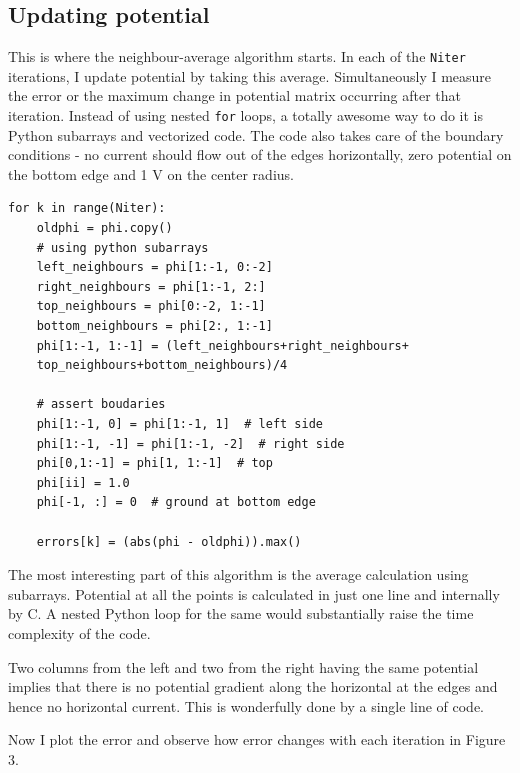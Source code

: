 \documentclass[11pt, a4paper]{article}
\begin{document}
\subsection{Updating potential}
This is where the neighbour-average algorithm starts. In each of the \texttt{Niter} iterations, I update potential by taking this average. Simultaneously I measure the error or the maximum change in potential matrix occurring after that iteration. Instead of using nested \texttt{for} loops, a totally awesome way to do it is Python subarrays and vectorized code. The code also takes care of the boundary conditions - no current should flow out of the edges horizontally, zero potential on the bottom edge and 1 V on the center radius.

\begin{verbatim}
for k in range(Niter):
    oldphi = phi.copy()
    # using python subarrays
    left_neighbours = phi[1:-1, 0:-2]
    right_neighbours = phi[1:-1, 2:]
    top_neighbours = phi[0:-2, 1:-1]
    bottom_neighbours = phi[2:, 1:-1]
    phi[1:-1, 1:-1] = (left_neighbours+right_neighbours+
    top_neighbours+bottom_neighbours)/4

    # assert boudaries
    phi[1:-1, 0] = phi[1:-1, 1]  # left side
    phi[1:-1, -1] = phi[1:-1, -2]  # right side
    phi[0,1:-1] = phi[1, 1:-1]  # top
    phi[ii] = 1.0
    phi[-1, :] = 0  # ground at bottom edge
 
    errors[k] = (abs(phi - oldphi)).max()

\end{verbatim}
The most interesting part of this algorithm is the average calculation using subarrays. Potential at all the points is calculated in just one line and internally by C. A nested Python loop for the same would substantially raise the time complexity of the code. 

Two columns from the left and two from the right having the same potential implies that there is no potential gradient along the horizontal at the edges and hence no horizontal current. This is wonderfully done by a single line of code.
   
Now I plot the error and observe how error changes with each iteration in Figure 3.
\end{document}
